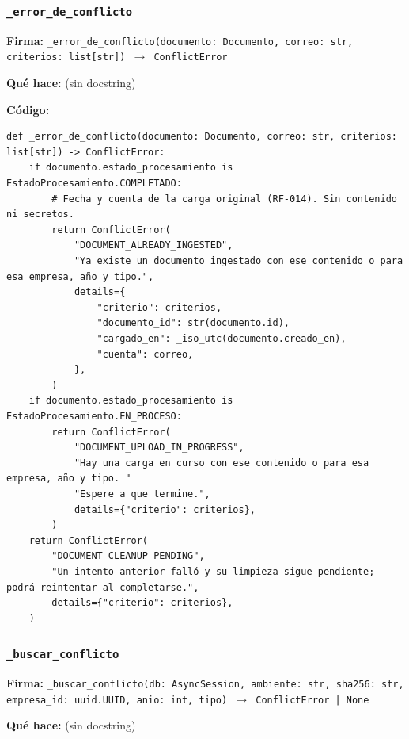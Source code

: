 \documentclass[11pt,a4paper]{article}
\begin{document}
\subsubsection*{\texttt{\_error\_de\_conflicto}}
\textbf{Firma:} \texttt{\_error\_de\_conflicto(documento: Documento, correo: str, criterios: list[str]) $\rightarrow$ ConflictError}

\textbf{Qué hace:} (sin docstring)

\textbf{Código:}
\begin{lstlisting}
def _error_de_conflicto(documento: Documento, correo: str, criterios: list[str]) -> ConflictError:
    if documento.estado_procesamiento is EstadoProcesamiento.COMPLETADO:
        # Fecha y cuenta de la carga original (RF-014). Sin contenido ni secretos.
        return ConflictError(
            "DOCUMENT_ALREADY_INGESTED",
            "Ya existe un documento ingestado con ese contenido o para esa empresa, año y tipo.",
            details={
                "criterio": criterios,
                "documento_id": str(documento.id),
                "cargado_en": _iso_utc(documento.creado_en),
                "cuenta": correo,
            },
        )
    if documento.estado_procesamiento is EstadoProcesamiento.EN_PROCESO:
        return ConflictError(
            "DOCUMENT_UPLOAD_IN_PROGRESS",
            "Hay una carga en curso con ese contenido o para esa empresa, año y tipo. "
            "Espere a que termine.",
            details={"criterio": criterios},
        )
    return ConflictError(
        "DOCUMENT_CLEANUP_PENDING",
        "Un intento anterior falló y su limpieza sigue pendiente; podrá reintentar al completarse.",
        details={"criterio": criterios},
    )
\end{lstlisting}

\subsubsection*{\texttt{\_buscar\_conflicto}}
\textbf{Firma:} \texttt{\_buscar\_conflicto(db: AsyncSession, ambiente: str, sha256: str, empresa\_id: uuid.UUID, anio: int, tipo) $\rightarrow$ ConflictError | None}

\textbf{Qué hace:} (sin docstring)
\end{document}
